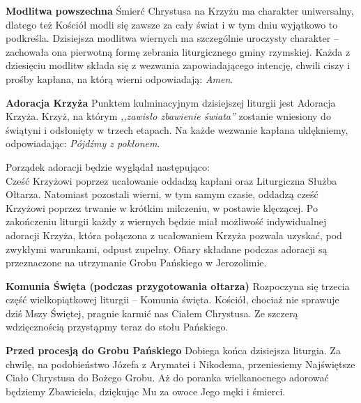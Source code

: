 \documentclass[10pt,oneside,final,notitlepage,a4paper,wide]{mwart}
\begin{document}
	\textbf{Modlitwa powszechna} Śmierć Chrystusa na Krzyżu ma charakter uniwersalny, dlatego też Kościół modli się zawsze za cały świat i w tym dniu wyjątkowo to podkreśla. Dzisiejsza modlitwa wiernych ma szczególnie uroczysty charakter -- zachowała ona pierwotną formę zebrania liturgicznego gminy rzymskiej. Każda z dziesięciu modlitw składa się z wezwania zapowiadającego intencję, chwili ciszy i prośby kapłana, na którą wierni odpowiadają: \emph{Amen}.\bigskip
	
	\textbf{Adoracja Krzyża} Punktem kulminacyjnym dzisiejszej liturgii jest Adoracja Krzyża. Krzyż, na którym \emph{,,zawisło zbawienie świata''} zostanie wniesiony do świątyni i odsłonięty w trzech etapach. Na każde wezwanie kapłana uklękniemy, odpowiadając: \emph{Pójdźmy z pokłonem}.
\par Porządek adoracji będzie wyglądał następująco:\\Cześć Krzyżowi poprzez ucałowanie oddadzą kapłani oraz Liturgiczna Służba Ołtarza. Natomiast pozostali wierni, w tym samym czasie, oddadzą cześć Krzyżowi poprzez trwanie w krótkim milczeniu, w postawie klęczącej. Po zakończeniu liturgii każdy z wiernych będzie miał możliwość indywidualnej adoracji Krzyża, która połączona z ucałowaniem Krzyża pozwala uzyskać, pod zwykłymi warunkami, odpust zupełny. Ofiary składane podczas adoracji są przeznaczone na utrzymanie Grobu Pańskiego w Jerozolimie.\bigskip
	
	\textbf{Komunia Święta (podczas przygotowania ołtarza)} Rozpoczyna się trzecia część wielkopiątkowej liturgii -- Komunia święta. Kościół, chociaż nie sprawuje dziś Mszy Świętej, pragnie karmić nas Ciałem Chrystusa. Ze szczerą wdzięcznością przystąpmy teraz do stołu Pańskiego. \bigskip
	
	\textbf{Przed procesją do Grobu Pańskiego} Dobiega końca dzisiejsza liturgia. Za chwilę, na podobieństwo Józefa z Arymatei i Nikodema, przeniesiemy Najświętsze Ciało Chrystusa do Bożego Grobu. Aż do poranka wielkanocnego adorować będziemy Zbawiciela, dziękując Mu za owoce Jego męki i śmierci.
\end{document}

